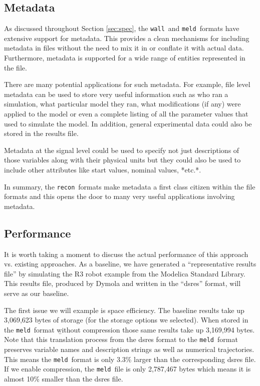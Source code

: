 \documentclass[11pt,a4paper,onecolumn]{article}
\newcommand{\recon}{\texttt{recon}}
\newcommand{\wall}{\texttt{wall}}
\newcommand{\meld}{\texttt{meld}}
\begin{document}
\subsection{Metadata}


As discussed throughout Section \ref{sec:spec}, the \wall\ and
\meld\ formats have extensive support for metadata.  This provides a
clean mechanisms for including metadata in files without the need to
mix it in or conflate it with actual data.  Furthermore, metadata is
supported for a wide range of entities represented in the file.

There are many potential applications for such metadata.  For example,
file level metadata can be used to store very useful information such
as who ran a simulation, what particular model they ran, what
modifications (if any) were applied to the model or even a complete
listing of all the parameter values that used to simulate the model.
In addition, general experimental data could also be stored in the
results file.

Metadata at the signal level could be used to specify not just
descriptions of those variables along with their physical units but
they could also be used to include other attributes like start values,
nominal values, *etc.*.

In summary, the \recon\ formats make metadata a first class citizen
within the file formats and this opens the door to many very useful
applications involving metadata.


\subsection{Performance}

It is worth taking a moment to discuss the actual performance of this
approach vs. existing approaches.  As a baseline, we have generated a
``representative results file'' by simulating the R3 robot example
from the Modelica Standard Library.  This results file, produced by
Dymola and written in the ``dsres'' format, will serve as our
baseline.


The first issue we will example is space efficiency.  The baseline
results take up 3,069,623 bytes of storage (for the storage options we
selected).  When stored in the \meld\ format {\b without compression}
those same results take up 3,169,994 bytes.  Note that this
translation process from the dsres format to the \meld\ format
preserves variable names and description strings as well as numerical
trajectories.  This means the \meld\ format is only 3.3\% larger than
the corresponding dsres file.  If we enable compression, the
\meld\ file is only 2,787,467 bytes which means it is almost 10\%
smaller than the dsres file.
\end{document}
